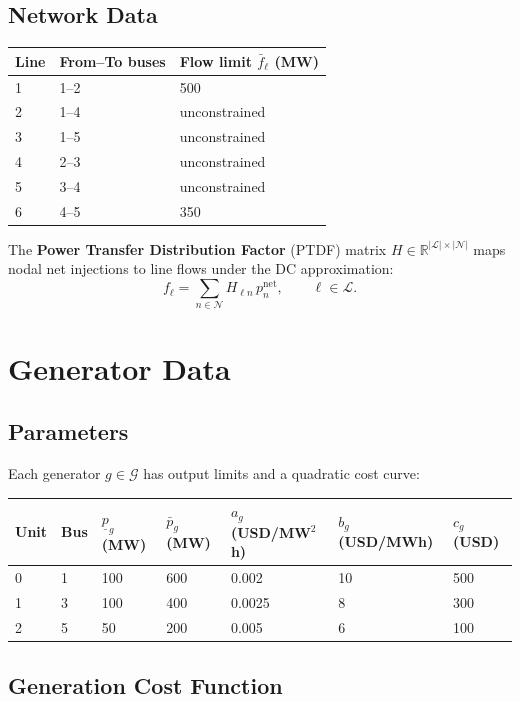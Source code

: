 \documentclass[11pt, letterpaper]{article}
\begin{document}
\subsection{Network Data}

\begin{tabular}{@{}lll@{}}
  \toprule
  Line & From--To buses & Flow limit $\bar{f}_\ell$ (MW) \\
  \midrule
  1 & 1--2 & 500 \\
  2 & 1--4 & unconstrained \\
  3 & 1--5 & unconstrained \\
  4 & 2--3 & unconstrained \\
  5 & 3--4 & unconstrained \\
  6 & 4--5 & 350 \\
  \bottomrule
\end{tabular}

\vspace{0.8em}
The \textbf{Power Transfer Distribution Factor} (PTDF) matrix
$H \in \mathbb{R}^{|\mathcal{L}| \times |\mathcal{N}|}$ maps nodal net injections
to line flows under the DC approximation:
\[
  f_\ell = \sum_{n \in \mathcal{N}} H_{\ell n}\, p^{\text{net}}_n, \qquad \ell \in \mathcal{L}.
\]

\section{Generator Data}

\subsection{Parameters}

Each generator $g \in \mathcal{G}$ has output limits and a quadratic cost curve:

\begin{tabular}{@{}lllllll@{}}
  \toprule
  Unit & Bus & $\underline{p}_g$ (MW) & $\bar{p}_g$ (MW)
       & $a_g$ (USD/MW$^2$h) & $b_g$ (USD/MWh) & $c_g$ (USD) \\
  \midrule
  0 & 1 & 100 & 600 & 0.002  & 10 & 500 \\
  1 & 3 & 100 & 400 & 0.0025 &  8 & 300 \\
  2 & 5 &  50 & 200 & 0.005  &  6 & 100 \\
  \bottomrule
\end{tabular}

\subsection{Generation Cost Function}
\end{document}

